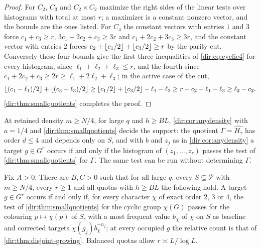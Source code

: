 \begin{proof}
For $C_2$, $C_3$ and $C_2\times C_2$ maximize the right sides of the linear tests over histograms with total at
most $r$; a maximizer is a constant nonzero vector, and the bounds are the ones listed. For $C_4$ the constant
vectors with entries $1$ and $3$ force $c_1+c_3\ge r$, $3c_1+2c_2+c_3\ge3r$ and $c_1+2c_2+3c_3\ge3r$, and the
constant vector with entries $2$ forces $c_2+\lfloor c_1/2\rfloor+\lfloor c_3/2\rfloor\ge r$ by the parity cut. Conversely
these four bounds give the first three inequalities of \eqref{dir:eq:cyclic4} for every histogram, since
$\ell_1+\ell_2+\ell_3\le r$, and the fourth since $c_1+2c_2+c_3\ge2r\ge\ell_1+2\ell_2+\ell_3$; in the active case
of the cut,
\[
 \lfloor(c_1-\ell_1)/2\rfloor+\lfloor(c_3-\ell_3)/2\rfloor\ge\lfloor c_1/2\rfloor+\lfloor c_3/2\rfloor-\ell_1-\ell_3\ge r-c_2-\ell_1-\ell_3\ge\ell_2-c_2 .
\]
\cref{dir:thm:smallquotients} completes the proof.
\end{proof}

At retained density $m\ge N/4$, for large $q$ and $h\ge BL$, \cref{dir:cor:anydensity} with $a=1/4$ and
\cref{dir:thm:smallquotients} decide the support: the quotient $\Gamma=\widehat{H_\tau}$ has order $d\le4$ and depends only on $S$, and with $b$
and $z_j$ as in \cref{dir:cor:anydensity} a target $g\in G^r$ occurs if and only if the histogram of
$(z_1,\dots,z_r)$ passes the test of \cref{dir:thm:smallquotients} for $\Gamma$. The same test can be run
without determining $\Gamma$.

\begin{theorem}\label{dir:thm:quarter}
Fix $A>0$. There are $B,C>0$ such that for all large $q$, every $S\subseteq\mathcal P$ with $m\ge N/4$, every
$r\ge1$ and all quotas with $h\ge BL$ the following hold. A target $g\in G^r$ occurs if and only if, for
every character $\chi$ of exact order $2$, $3$ or $4$, the test of \cref{dir:thm:smallquotients} for the cyclic
group $\chi(G)$ passes for the colouring $p\mapsto\chi(p)$ of $S$, with a most frequent value $b_\chi$ of $\chi$ on
$S$ as baseline and corrected targets $\chi(g_j)b_\chi^{-n_j}$; at every occupied $g$ the relative count is that
of \cref{dir:thm:disjoint-growing}. Balanced quotas allow $r\asymp L/\log L$.
\end{theorem}

